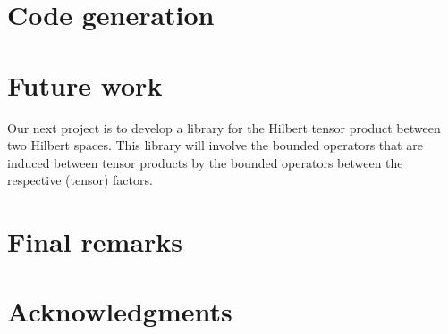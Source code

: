 \documentclass[12pt]{article}
\theoremstyle{definition}
\begin{document}
\section{Code generation}
\blindtext[6]


\section{Future work}
Our next project is to develop a library for the Hilbert tensor product between two Hilbert spaces. This library will involve the bounded operators that are induced between tensor products by the bounded operators between the respective (tensor) factors.

\section{Final remarks}
\blindtext[3]

\section*{Acknowledgments}
\blindtext[1]




\end{document}

